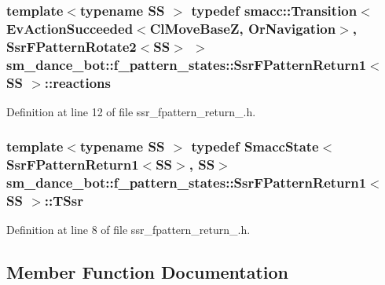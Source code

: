 \subsubsection[{\texorpdfstring{reactions}{reactions}}]{\setlength{\rightskip}{0pt plus 5cm}template$<$typename SS $>$ typedef {\bf smacc\+::\+Transition}$<$Ev\+Action\+Succeeded$<${\bf Cl\+Move\+BaseZ}, {\bf Or\+Navigation}$>$, {\bf Ssr\+F\+Pattern\+Rotate2}$<$SS$>$ $>$ {\bf sm\+\_\+dance\+\_\+bot\+::f\+\_\+pattern\+\_\+states\+::\+Ssr\+F\+Pattern\+Return1}$<$ SS $>$\+::{\bf reactions}}\hypertarget{structsm__dance__bot_1_1f__pattern__states_1_1SsrFPatternReturn1_aa5df2d3dbbe99de666b7e1a8429e71bd}{}\label{structsm__dance__bot_1_1f__pattern__states_1_1SsrFPatternReturn1_aa5df2d3dbbe99de666b7e1a8429e71bd}


Definition at line 12 of file ssr\+\_\+fpattern\+\_\+return\+\_.\+h.

\subsubsection[{\texorpdfstring{T\+Ssr}{TSsr}}]{\setlength{\rightskip}{0pt plus 5cm}template$<$typename SS $>$ typedef {\bf Smacc\+State}$<${\bf Ssr\+F\+Pattern\+Return1}$<$SS$>$, SS$>$ {\bf sm\+\_\+dance\+\_\+bot\+::f\+\_\+pattern\+\_\+states\+::\+Ssr\+F\+Pattern\+Return1}$<$ SS $>$\+::{\bf T\+Ssr}}\hypertarget{structsm__dance__bot_1_1f__pattern__states_1_1SsrFPatternReturn1_a211ff69eaf4c8969acb0699efa0bd51a}{}\label{structsm__dance__bot_1_1f__pattern__states_1_1SsrFPatternReturn1_a211ff69eaf4c8969acb0699efa0bd51a}


Definition at line 8 of file ssr\+\_\+fpattern\+\_\+return\+\_.\+h.



\subsection{Member Function Documentation}
